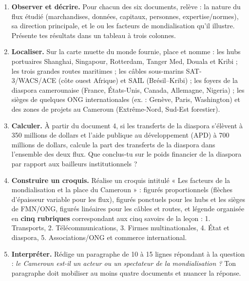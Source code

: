 \documentclass[11pt]{article}
\newcounter{popsec}
\newcounter{popsub}
\newcommand{\courssub}[1]{%
  \stepcounter{popsub}%
  \par\vspace{9pt}\noindent{\popxbold\fontsize{11.5}{13}\selectfont\color{popink}{\color{poporange}\thepopsec.\thepopsub}\hspace{6pt}#1}\par\nopagebreak\vspace{4pt}
}
\begin{document}
\begin{enumerate}
\item \textbf{Observer et décrire.} Pour chacun des six documents, relève : la nature du flux étudié (marchandises, données, capitaux, personnes, expertise/normes), sa direction principale, et le ou les facteurs de mondialisation qu'il illustre. Présente tes résultats dans un tableau à trois colonnes.
\item \textbf{Localiser.} Sur la carte muette du monde fournie, place et nomme : les hubs portuaires Shanghai, Singapour, Rotterdam, Tanger Med, Douala et Kribi ; les trois grandes routes maritimes ; les câbles sous-marins SAT-3/WACS/ACE (côte ouest Afrique) et SAIL (Brésil--Kribi) ; les foyers de la diaspora camerounaise (France, États-Unis, Canada, Allemagne, Nigeria) ; les sièges de quelques ONG internationales (ex. : Genève, Paris, Washington) et des zones de projets au Cameroun (Extrême-Nord, Sud-Est forestier).
\item \textbf{Calculer.} À partir du document 4, si les transferts de la diaspora s'élèvent à 350 millions de dollars et l'aide publique au développement (APD) à 700 millions de dollars, calcule la part des transferts de la diaspora dans l'ensemble des deux flux. Que conclus-tu sur le poids financier de la diaspora par rapport aux bailleurs institutionnels ?
\item \textbf{Construire un croquis.} Réalise un croquis intitulé « Les facteurs de la mondialisation et la place du Cameroun » : figurés proportionnels (flèches d'épaisseur variable pour les flux), figurés ponctuels pour les hubs et les sièges de FMN/ONG, figurés linéaires pour les câbles et routes, et légende organisée en \textbf{cinq rubriques} correspondant aux cinq savoirs de la leçon : 1. Transports, 2. Télécommunications, 3. Firmes multinationales, 4. État et diaspora, 5. Associations/ONG et commerce international.
\item \textbf{Interpréter.} Rédige un paragraphe de 10 à 15 lignes répondant à la question : \emph{le Cameroun est-il un acteur ou un spectateur de la mondialisation ?} Ton paragraphe doit mobiliser au moins quatre documents et nuancer la réponse.
\end{enumerate}

\courssub{Ressources à mobiliser}
\end{document}
